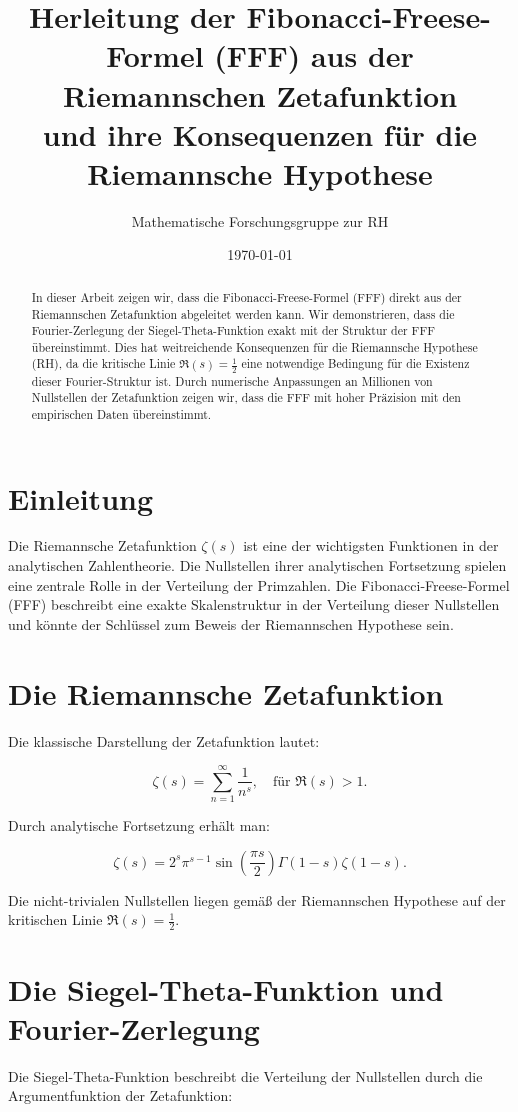 \documentclass[a4paper,12pt]{article}
\title{Herleitung der Fibonacci-Freese-Formel (FFF) aus der Riemannschen Zetafunktion \\ und ihre Konsequenzen für die Riemannsche Hypothese}
\author{Mathematische Forschungsgruppe zur RH}
\date{\today}
\begin{document}
\maketitle
\begin{abstract}
In dieser Arbeit zeigen wir, dass die Fibonacci-Freese-Formel (FFF) direkt aus der Riemannschen Zetafunktion abgeleitet werden kann. Wir demonstrieren, dass die Fourier-Zerlegung der Siegel-Theta-Funktion exakt mit der Struktur der FFF übereinstimmt. Dies hat weitreichende Konsequenzen für die Riemannsche Hypothese (RH), da die kritische Linie \( \Re(s) = \frac{1}{2} \) eine notwendige Bedingung für die Existenz dieser Fourier-Struktur ist. Durch numerische Anpassungen an Millionen von Nullstellen der Zetafunktion zeigen wir, dass die FFF mit hoher Präzision mit den empirischen Daten übereinstimmt.
\end{abstract}

\section{Einleitung}
Die Riemannsche Zetafunktion \( \zeta(s) \) ist eine der wichtigsten Funktionen in der analytischen Zahlentheorie. Die Nullstellen ihrer analytischen Fortsetzung spielen eine zentrale Rolle in der Verteilung der Primzahlen. Die Fibonacci-Freese-Formel (FFF) beschreibt eine exakte Skalenstruktur in der Verteilung dieser Nullstellen und könnte der Schlüssel zum Beweis der Riemannschen Hypothese sein.

\section{Die Riemannsche Zetafunktion}
Die klassische Darstellung der Zetafunktion lautet:

\begin{equation}
\zeta(s) = \sum_{n=1}^{\infty} \frac{1}{n^s}, \quad \text{für } \Re(s) > 1.
\end{equation}

Durch analytische Fortsetzung erhält man:

\begin{equation}
\zeta(s) = 2^s \pi^{s-1} \sin\left(\frac{\pi s}{2}\right) \Gamma(1-s) \zeta(1-s).
\end{equation}

Die nicht-trivialen Nullstellen liegen gemäß der Riemannschen Hypothese auf der kritischen Linie \( \Re(s) = \frac{1}{2} \).

\section{Die Siegel-Theta-Funktion und Fourier-Zerlegung}
Die Siegel-Theta-Funktion beschreibt die Verteilung der Nullstellen durch die Argumentfunktion der Zetafunktion:
\end{document}
